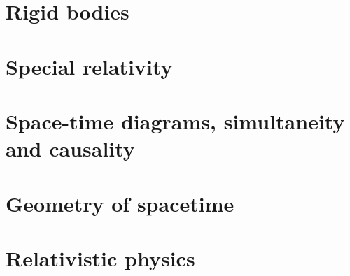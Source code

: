 \documentclass{article}
\begin{document}
\section{Rigid bodies}

\section{Special relativity}

\section{Space-time diagrams, simultaneity and causality}

\section{Geometry of spacetime}

\section{Relativistic physics}

\end{document}
